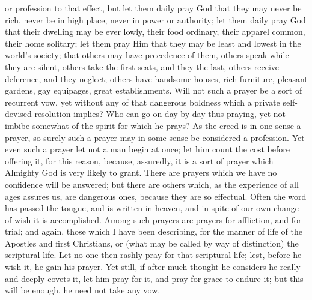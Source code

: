 or profession to that effect, but let them daily pray God that they
may never be rich, never be in high place, never in power or
authority; let them daily pray God that their dwelling may be ever
lowly, their food ordinary, their apparel common, their home solitary;
let them pray Him that they may be least and lowest in the world's
society; that others may have precedence of them, others speak while
they are silent, others take the first seats, and they the last,
others receive deference, and they neglect; others have handsome
houses, rich furniture, pleasant gardens, gay equipages, great
establishments. Will not such a prayer be a sort of recurrent vow, yet
without any of that dangerous boldness which a private self-devised
resolution implies? Who can go on day by day thus praying, yet not
imbibe somewhat of the spirit for which he prays? As the creed is in
one sense a prayer, so surely such a prayer may in some sense be
considered a profession. Yet even such a prayer let not a man begin at
once; let him count the cost before offering it, for this reason,
because, assuredly, it is a sort of prayer which Almighty God is very
likely to grant. There are prayers which we have no confidence will be
answered; but there are others which, as the experience of all ages
assures us, are dangerous ones, because they are so effectual. Often
the word has passed the tongue, and is written in heaven, and in spite
of our own change of wish it is accomplished. Among such prayers are
prayers for affliction, and for trial; and again, those which I have
been describing, for the manner of life of the Apostles and first
Christians, or (what may be called by way of distinction) the
scriptural life. Let no one then rashly pray for that scriptural life;
lest, before he wish it, he gain his prayer. Yet still, if after much
thought he considers he really and deeply covets it, let him pray for
it, and pray for grace to endure it; but this will be enough, he need
not take any vow.

